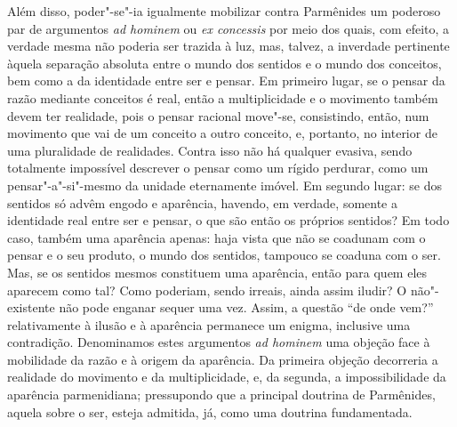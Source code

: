 Além disso, poder"-se"-ia igualmente mobilizar contra Parmênides um
poderoso par de argumentos \textit{ad hominem} ou \textit{ex concessis}
por meio dos quais, com efeito, a verdade mesma não poderia ser trazida
à luz, mas, talvez, a inverdade pertinente àquela separação absoluta
entre o mundo dos sentidos e o mundo dos conceitos, bem como a da
identidade entre ser e pensar. Em primeiro lugar, se o pensar da razão
mediante conceitos é real, então a multiplicidade e o movimento também
devem ter realidade, pois o pensar racional move"-se, consistindo, então,
num movimento que vai de um conceito a outro conceito, e, portanto, no
interior de uma pluralidade de realidades. Contra isso não há qualquer
evasiva, sendo totalmente impossível descrever o pensar como um rígido
perdurar, como um pensar"-a"-si"-mesmo da unidade eternamente imóvel. Em
segundo lugar: se dos sentidos só advêm engodo e aparência, havendo, em
verdade, somente a identidade real entre ser e pensar, o que são então
os próprios sentidos? Em todo caso, também uma aparência apenas: haja
vista que não se coadunam com o pensar e o seu produto, o mundo dos
sentidos, tampouco se coaduna com o ser. Mas, se os sentidos mesmos
constituem uma aparência, então para quem eles aparecem como tal? Como
poderiam, sendo irreais, ainda assim iludir? O não"-existente não pode
enganar sequer uma vez. Assim, a questão ``de onde vem?'' relativamente à
ilusão e à aparência permanece um enigma, inclusive uma contradição.
Denominamos estes argumentos \textit{ad hominem} uma objeção face à
mobilidade da razão e à origem da aparência. Da primeira objeção
decorreria a realidade do movimento e da multiplicidade, e, da segunda,
a impossibilidade da aparência parmenidiana; pressupondo que a
principal doutrina de Parmênides, aquela sobre o ser, esteja admitida,
já, como uma doutrina fundamentada.


